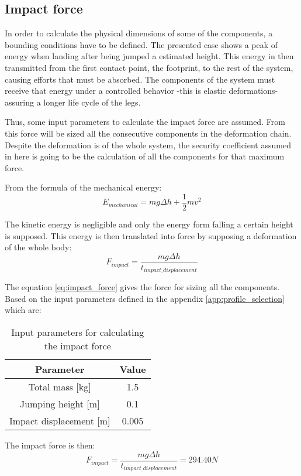\subsection{Impact force} %
\label{sub:impact_force}
In order to calculate the physical dimensions of some of the components, a bounding conditions have to be defined.
The presented case shows a peak of energy when landing after being jumped a estimated height.
This energy in then transmitted from the first contact point, the footprint, to the rest of the system, causing efforts that must be absorbed.
The components of the system must receive that energy under a controlled behavior -this is elastic deformations- assuring a longer life cycle of the legs.

Thus, some input parameters to calculate the impact force are assumed.
From this force will be sized all the consecutive components in the deformation chain.
Despite the deformation is of the whole system, the security coefficient assumed in here is going to be the calculation of all the components for that maximum force.

From the formula of the mechanical energy:
\begin{equation}
  E_{mechanical} = m g \Delta h + \frac{1}{2} m v^{2}
\end{equation}

The kinetic energy is negligible and only the energy form falling a certain height is supposed.
This energy is then translated into force by supposing a deformation of the whole body:
\begin{equation}
\label{eq:impact_force}
  F_{impact} = \frac{m g \Delta h}{t_{impact\_displacement}}
\end{equation}

The equation \ref{eq:impact_force} gives the force for sizing all the components.
Based on the input parameters defined in the appendix \ref{app:profile_selection} which are:
\begin{table}
\begin{center}
\begin{tabular}{c | c}
  Parameter & Value \\
  \hline
  Total mass [kg] & 1.5 \\
  Jumping height [m] & 0.1 \\
  Impact displacement [m] & 0.005
\end{tabular}
\caption{Input parameters for calculating the impact force}
\label{tab:input_parameter_impact_force}
\end{center}
\end{table}

The impact force is then:
\begin{equation}
  F_{impact} = \frac{m g \Delta h}{t_{impact\_displacement}} = 294.40 N 
\end{equation}
